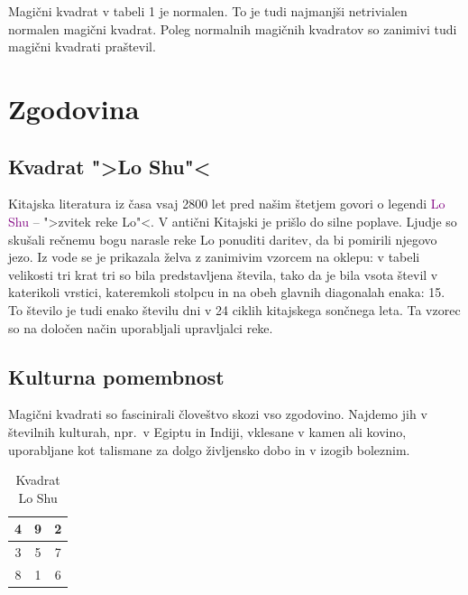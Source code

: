 \documentclass[a4paper,12pt]{article}
\begin{document}
Magični kvadrat v tabeli 1 je  normalen.
To je tudi najmanjši netrivialen normalen magični kvadrat.
Poleg normalnih magičnih kvadratov so zanimivi tudi magični kvadrati praštevil.


\section{Zgodovina}

\subsection{Kvadrat ">Lo Shu"<}

Kitajska literatura iz časa vsaj 2800 let pred našim štetjem govori o legendi
\textcolor{purple}{Lo Shu} -- ">zvitek reke Lo"<. V antični Kitajski je prišlo do
silne poplave. Ljudje so skušali rečnemu bogu narasle reke Lo ponuditi daritev,
da bi pomirili njegovo jezo. Iz vode se je prikazala želva z zanimivim vzorcem
na oklepu: v tabeli velikosti tri krat tri so bila predstavljena števila, tako
da je bila vsota števil v katerikoli vrstici, kateremkoli stolpcu in na obeh
glavnih diagonalah enaka: 15. To število je tudi enako številu dni v 24 ciklih
kitajskega sončnega leta. Ta vzorec so na določen način uporabljali upravljalci
reke.





\subsection{Kulturna pomembnost}

Magični kvadrati so fascinirali človeštvo skozi vso zgodovino. Najdemo jih
v številnih kulturah, npr.\ v Egiptu in Indiji, vklesane v kamen ali
kovino, uporabljane kot talismane za dolgo življensko dobo in v
izogib boleznim.

\begin{table}[h!]
   \centering
   \caption{Kvadrat Lo Shu} 
   \label{tabel: shu}
   \begin{tabular}{|c|c|c|}
       \hline
       4 & 9 & 2 \\\hline
       3 & 5 & 7 \\\hline
       8 & 1 & 6 \\\hline
   \end{tabular}
\end{table}
\end{document}
